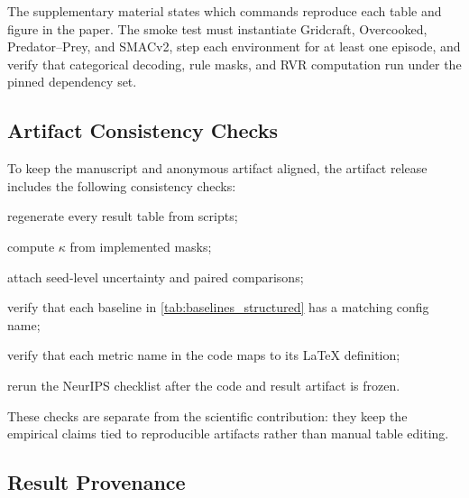 \documentclass{article}
\theoremstyle{plain}
\theoremstyle{definition}
\theoremstyle{remark}
\begin{document}
The supplementary material states which commands reproduce each table and figure in the paper.
The smoke test must instantiate Gridcraft, Overcooked, Predator--Prey, and SMACv2,
step each environment for at least one episode, and verify that categorical
decoding, rule masks, and RVR computation run under the pinned dependency set.

\subsection{Artifact Consistency Checks}
\label{app:submission_gate}

To keep the manuscript and anonymous artifact aligned, the artifact release includes the following consistency checks:
\begin{enumerate*}[label={\roman*) }, itemjoin={; \quad}]
  \item regenerate every result table from scripts;
  \item compute $\kappa$ from implemented masks;
  \item attach seed-level uncertainty and paired comparisons;
  \item verify that each baseline in \autoref{tab:baselines_structured} has a matching config name;
  \item verify that each metric name in the code maps to its LaTeX definition;
  \item rerun the NeurIPS checklist after the code and result artifact is frozen.
\end{enumerate*}
These checks are separate from the scientific contribution: they keep the empirical claims tied to reproducible artifacts rather than manual table editing.

\subsection{Result Provenance}
\label{app:result_provenance}
\end{document}
